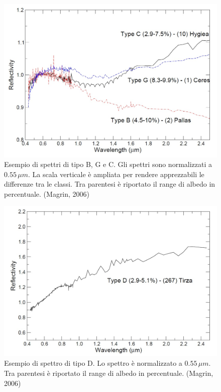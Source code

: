 \documentclass[a4paper,11pt,openright]{book}
\begin{document}
\begin{figure}
    \centering
    \includegraphics[scale=0.3]{figure/spettro_bgc.jpg}
    \caption[Esempio di spettri di tipo B, G e C.]{Esempio di spettri di tipo B, G e C. Gli spettri sono normalizzati a $0.55\,\mu m$. La scala verticale è ampliata per rendere apprezzabili le differenze tra le classi. Tra parentesi è riportato il range di albedo in percentuale. (Magrin, 2006)}
    \label{spettro_bgc}
\end{figure}

\begin{figure}
    \centering
    \includegraphics[scale=0.3]{figure/spettro_d.jpg}
    \caption[Esempio di spettro di tipo D.]{Esempio di spettro di tipo D. Lo spettro è normalizzato a $0.55\,\mu m$. Tra parentesi è riportato il range di albedo in percentuale. (Magrin, 2006)}
    \label{spettro_d}
\end{figure}
\end{document}
